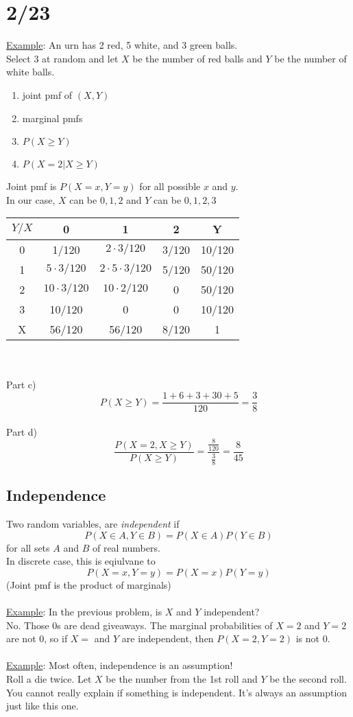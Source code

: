 \section*{2/23}
  \underline{Example}: An urn has 2 red, 5 white, and 3 green balls.\\
  Select 3 at random and let $X$ be the number of red balls and $Y$ be the
  number of white balls.\\
  \begin{enumerate}
    \item joint pmf of $(X,Y)$
    \item marginal pmfs
    \item $P(X \ge Y)$
    \item $P(X = 2 | X \ge Y)$
  \end{enumerate}
  Joint pmf is $P(X = x, Y = y)$ for all possible $x$ and $y$.\\
  In our case, $X$ can be $0, 1, 2$ and $Y$ can be $0, 1, 2, 3$\\
  \begin{tabular}{c|c|c|c|c}
    $Y/ X$ & 0 & 1 & 2 & Y\\
    \hline
    0 & 1/120 & $2 \cdot 3/120$ & 3/120 & 10/120\\
    \hline
    1 & $5\cdot3/120$ & $2 \cdot5 \cdot3/120$ & 5/120 & 50/120\\
    \hline
    2 & $10\cdot3/120$ & $10\cdot2/120$ & 0 & 50/120\\
    \hline
    3 & 10/120 & 0 & 0 & 10/120\\
    \hline
    X & 56/120 & 56/120 & 8/120 & 1\\
  \end{tabular}\\\\
  Part c) 
  $$
    P(X \ge Y) = \frac{1+6+3+30+5}{120} = \frac{3}{8}
  $$\\
  Part d) 
  $$
    \frac{P(X = 2, X \ge Y)}{P(X \ge Y)} = \frac{\frac{8}{120}}{\frac{3}{8}} = \frac{8}{45}
  $$
  \subsection*{Independence}
    Two random variables, are {\it independent} if
    $$
      P(X \in A, Y \in B) = P(X \in A)P(Y \in B)
    $$
    for all sets $A$ and $B$ of real numbers. \\
    In discrete case, this is eqiulvane to
    $$
      P(X=x, Y=y) = P(X=x)P(Y=y)
    $$
    (Joint pmf is the product of marginals)\\\\
    \underline{Example}: In the previous problem, is $X$ and $Y$ independent?\\
    No. Those 0s are dead giveaways. The marginal probabilities of $X = 2$ and
    $Y = 2$ are not 0, so if $X=$ and $Y$ are independent, then
    $P(X = 2, Y = 2)$ is not 0.\\\\
    \underline{Example}: Most often, independence is an assumption!\\
      Roll a die twice. Let $X$ be the number from the 1st roll and $Y$ be
      the second roll. You cannot really explain if something is independent.
      It's always an assumption just like this one.
